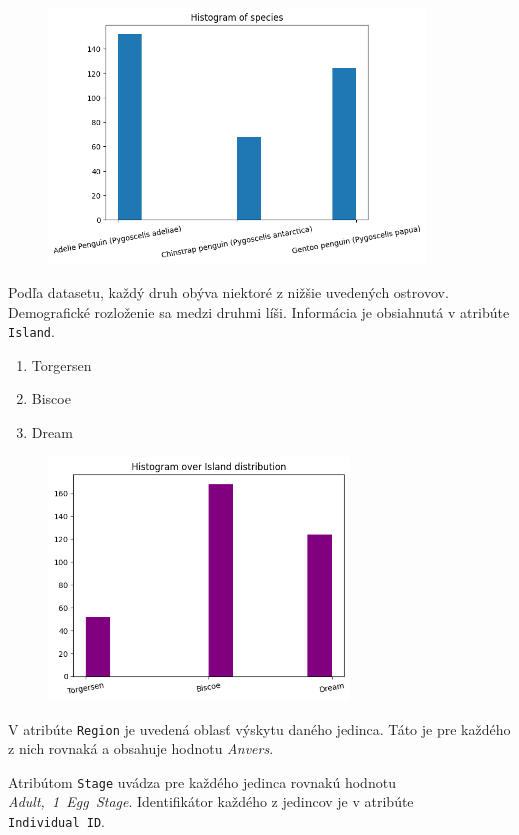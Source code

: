 \documentclass[10pt,xcolor=pdflatex,dvipsnames,table,oneside]{book}
\begin{document}
\begin{figure}[h]
\includegraphics[width=10cm]{img/species.png}
\centering
\end{figure}
\pagebreak





Podľa datasetu, každý druh obýva niektoré z nižšie uvedených ostrovov. Demografické rozloženie sa medzi druhmi líši. Informácia je obsiahnutá v atribúte \texttt{Island}.
\begin{enumerate}
  \item Torgersen
  \item Biscoe
  \item Dream
\end{enumerate}

\begin{figure}[h]
\includegraphics[width=8cm]{img/island.png}
\centering
\end{figure}



V atribúte \texttt{Region} je uvedená oblasť výskytu daného jedinca. Táto je pre každého z nich rovnaká a obsahuje hodnotu \textit{Anvers}.

Atribútom \texttt{Stage} uvádza pre každého jedinca rovnakú hodnotu \textit{Adult,~1~Egg~Stage}. Identifikátor každého z jedincov je v atribúte \texttt{Individual~ID}.
\end{document}
